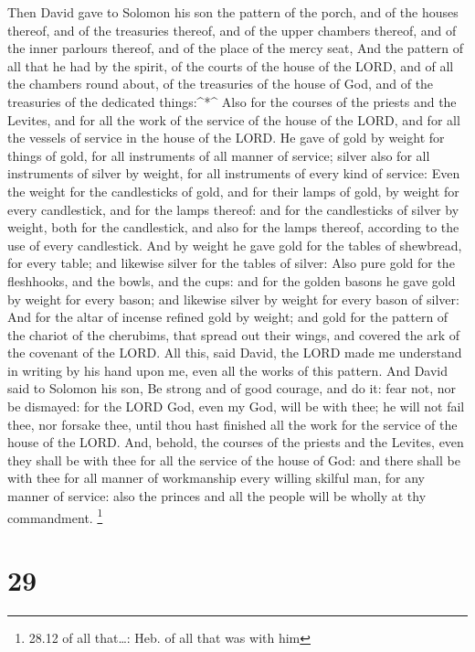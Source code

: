  Then David gave to Solomon his son the pattern of the
porch, and of the houses thereof, and of the treasuries thereof, and of
the upper chambers thereof, and of the inner parlours thereof, and of
the place of the mercy seat,  And the pattern of all that
he had by the spirit, of the courts of the house of the LORD, and of all
the chambers round about, of the treasuries of the house of God, and of
the treasuries of the dedicated things:\^{}*\^{}  Also for
the courses of the priests and the Levites, and for all the work of the
service of the house of the LORD, and for all the vessels of service in
the house of the LORD.  He gave of gold by weight for
things of gold, for all instruments of all manner of service; silver
also for all instruments of silver by weight, for all instruments of
every kind of service:  Even the weight for the
candlesticks of gold, and for their lamps of gold, by weight for every
candlestick, and for the lamps thereof: and for the candlesticks of
silver by weight, both for the candlestick, and also for the lamps
thereof, according to the use of every candlestick.  And by
weight he gave gold for the tables of shewbread, for every table; and
likewise silver for the tables of silver:  Also pure gold
for the fleshhooks, and the bowls, and the cups: and for the golden
basons he gave gold by weight for every bason; and likewise silver by
weight for every bason of silver:  And for the altar of
incense refined gold by weight; and gold for the pattern of the chariot
of the cherubims, that spread out their wings, and covered the ark of
the covenant of the LORD.  All this, said David, the LORD
made me understand in writing by his hand upon me, even all the works of
this pattern.  And David said to Solomon his son, Be strong
and of good courage, and do it: fear not, nor be dismayed: for the LORD
God, even my God, will be with thee; he will not fail thee, nor forsake
thee, until thou hast finished all the work for the service of the house
of the LORD.  And, behold, the courses of the priests and
the Levites, even they shall be with thee for all the service of the
house of God: and there shall be with thee for all manner of workmanship
every willing skilful man, for any manner of service: also the princes
and all the people will be wholly at thy commandment. \footnote{28.12 of
  all that\ldots: Heb. of all that was with him}

\hypertarget{section-28}{%
\section{29}\label{section-28}}

